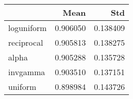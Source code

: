 \begin{tabular}{lrr}
\toprule
{} &      Mean &       Std \\
\midrule
loguniform &  0.906050 &  0.138409 \\
reciprocal &  0.905813 &  0.138275 \\
alpha      &  0.905288 &  0.135728 \\
invgamma   &  0.903510 &  0.137151 \\
uniform    &  0.898984 &  0.143726 \\
\bottomrule
\end{tabular}
